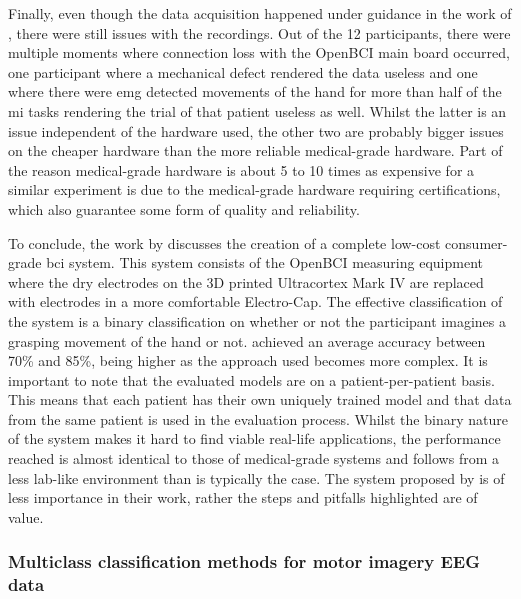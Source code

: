 Finally, even though the data acquisition happened under guidance in the work of \citet{cheap_bci_feasibility}, there were still issues with the recordings.
Out of the 12 participants, there were multiple moments where connection loss with the OpenBCI main board occurred, one participant where a mechanical defect rendered the data useless and one where there were \gls{emg} detected movements of the hand for more than half of the \gls{mi} tasks rendering the trial of that patient useless as well.
Whilst the latter is an issue independent of the hardware used, the other two are probably bigger issues on the cheaper hardware than the more reliable medical-grade hardware.
Part of the reason medical-grade hardware is about 5 to 10 times as expensive for a similar experiment is due to the medical-grade hardware requiring certifications, which also guarantee some form of quality and reliability. 

To conclude, the work by  discusses the creation of a complete low-cost consumer-grade \gls{bci} system.
This system consists of the OpenBCI measuring equipment where the dry electrodes on the 3D printed Ultracortex Mark IV are replaced with electrodes in a more comfortable Electro-Cap.
The effective classification of the system is a binary  classification on whether or not the participant imagines a grasping movement of the hand or not.
 achieved an average accuracy between 70\% and 85\%, being higher as the approach used becomes more complex.
It is important to note that the evaluated models are on a patient-per-patient basis.
This means that each patient has their own uniquely trained model and that data from the same patient is used in the evaluation process.
Whilst the binary nature of the system makes it hard to find viable real-life applications, the performance reached is almost identical to those of medical-grade systems and follows from a less lab-like environment than is typically the case.
The system proposed by  is of less importance in their work, rather the steps and pitfalls highlighted are of value.




\subsubsection{Multiclass classification methods for motor imagery EEG data}
\label{subsubsec:bci_opportunities_obstacles_motivating_examples_mi_classification}

